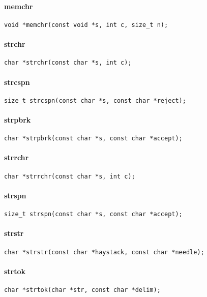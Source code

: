 \paragraph{memchr}
\begin{Verbatim}
void *memchr(const void *s, int c, size_t n);
\end{Verbatim}
\paragraph{strchr}
\begin{Verbatim}
char *strchr(const char *s, int c);
\end{Verbatim}
\paragraph{strcspn}
\begin{Verbatim}
size_t strcspn(const char *s, const char *reject);
\end{Verbatim}
\paragraph{strpbrk}
\begin{Verbatim}
char *strpbrk(const char *s, const char *accept);
\end{Verbatim}
\paragraph{strrchr}
\begin{Verbatim}
char *strrchr(const char *s, int c);
\end{Verbatim}
\paragraph{strspn}
\begin{Verbatim}
size_t strspn(const char *s, const char *accept);
\end{Verbatim}
\paragraph{strstr}
\begin{Verbatim}
char *strstr(const char *haystack, const char *needle);
\end{Verbatim}
\paragraph{strtok}
\begin{Verbatim}
char *strtok(char *str, const char *delim);
\end{Verbatim}

